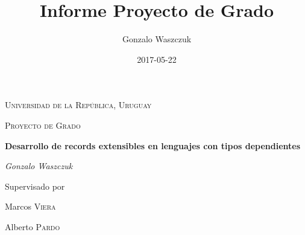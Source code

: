 \documentclass[a4paper,oneside,openany,spanish]{book}
\title{Informe Proyecto de Grado}
\author{Gonzalo Waszczuk}
\begin{document}
\frontmatter

\begin{titlepage}
	\centering
	{\scshape\LARGE Universidad de la República, Uruguay \par}
	\vspace{1cm}
	{\scshape\Large Proyecto de Grado\par}
	\vspace{1.5cm}
	{\huge\bfseries Desarrollo de records extensibles en lenguajes con tipos dependientes\par}
	\vspace{2cm}
	{\Large\itshape Gonzalo Waszczuk\par}
	\vfill
	Supervisado por\par
	Marcos \textsc{Viera}\par
        Alberto \textsc{Pardo}
	\vfill

	{\large \date{2017-05-22}\par}
\end{titlepage}



\tableofcontents


\mainmatter

\cleardoublepage

















\printbibliography



\end{document}
